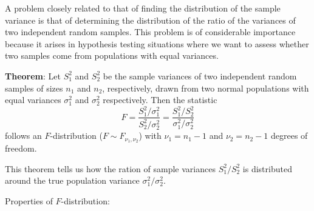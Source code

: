 \documentclass[twoside]{book}
\begin{document}
A problem closely related to that of finding the distribution of the sample variance is that of determining the distribution of the ratio of the variances of two independent random samples. This problem is of considerable importance because it arises in hypothesis testing situations where we want to assess whether two samples come from populations with equal variances.

\begin{textbox}
\textbf{Theorem}: Let \( S_1^2 \) and \( S_2^2 \) be the sample variances of two independent random samples of sizes \( n_1 \) and \( n_2 \), respectively, drawn from two normal populations with equal variances $\sigma_1^2$ and $\sigma_2^2$ respectively. Then the statistic
\[
F = \dfrac{S_1^2/\sigma_1^2}{S_2^2/\sigma_2^2} = \dfrac{S_1^2/S_2^2}{\sigma_1^2/\sigma_2^2}
\]
follows an $ F $-distribution ($F \sim F_{\nu_1, \nu_2}$) with \( \nu_1 = n_1 - 1 \) and \( \nu_2 = n_2 - 1 \) degrees of freedom.
\end{textbox}
This theorem tells us how the ration of sample variances \( {S_1^2}/{S_2^2} \) is distributed around the true population variance \( {\sigma_1^2}/{\sigma_2^2} \).

Properties of $F$-distribution:
\end{document}
